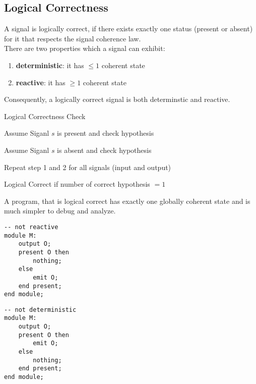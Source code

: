\documentclass[german]{latex4ei/latex4ei_sheet}
\begin{document}
\begin{sectionbox}
\subsection{Logical Correctness}
A signal is logically correct, if there exists exactly one status (present or absent) for it that respects the signal coherence law.\\
There are two properties which a signal can exhibit:
\begin{enumerate}
\item \textbf{deterministic}: it has $\le 1$ coherent state
\item \textbf{reactive}: it has $\ge 1$ coherent state
\end{enumerate}
Consequently, a logically correct signal is both determinstic and reactive.

\begin{cookbox}{Logical Correctness Check}
	\item Assume Siganl $s$ is present and check hypothesis
	\item Assume Siganl $s$ is absent and check hypothesis
	\item Repeat step 1 and 2 for all signals (input and output)
	\item Logical Correct if number of correct hypothesis $ = 1$
\end{cookbox}
A program, that is logical correct has exactly one globally coherent state and is much simpler to debug and analyze.
\end{sectionbox}

\begin{minipage}{.49\columnwidth}
\begin{lstlisting}
-- not reactive
module M:
	output O;
	present O then
		nothing;
	else
		emit O;
	end present;
end module;
\end{lstlisting}
\end{minipage}
\begin{minipage}{.49\columnwidth}
\begin{lstlisting}
-- not deterministic
module M:
	output O;
	present O then
		emit O;
	else
		nothing;
	end present;
end module;
\end{lstlisting}
\end{minipage}
\end{document}
